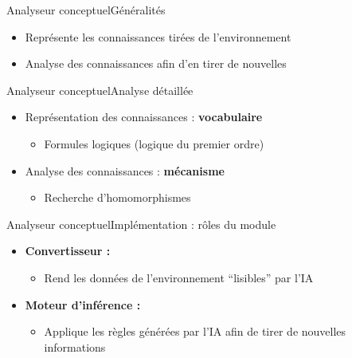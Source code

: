 \begin{frame}{Analyseur conceptuel}{Généralités}
\begin{itemize}
  \item Représente les connaissances tirées de l'environnement
  \item Analyse des connaissances afin d'en tirer de nouvelles
\end{itemize}
\end{frame}

\begin{frame}{Analyseur conceptuel}{Analyse détaillée}
\begin{itemize}
  \item Représentation des connaissances : \textbf{vocabulaire}
  \begin{itemize}
    \item Formules logiques (logique du premier ordre)
  \end{itemize}
  \pause
  \item Analyse des connaissances : \textbf{mécanisme}
  \begin{itemize}
    \item Recherche d'homomorphismes
  \end{itemize}
\end{itemize}
\end{frame}

\begin{frame}{Analyseur conceptuel}{Implémentation : rôles du module}
\begin{itemize}
  \item \textbf{Convertisseur :}
  \begin{itemize}
    \item Rend les données de l'environnement \enquote{lisibles} par l'IA
  \end{itemize}
  \item \textbf{Moteur d'inférence :}
  \begin{itemize}
    \item Applique les règles générées par l'IA afin de
    tirer de nouvelles informations
  \end{itemize}
\end{itemize}
\end{frame}

